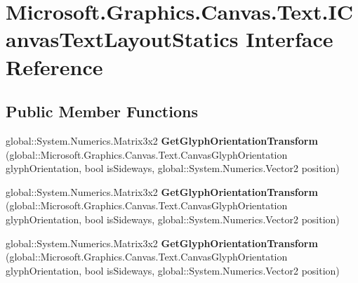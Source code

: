 \hypertarget{interface_microsoft_1_1_graphics_1_1_canvas_1_1_text_1_1_i_canvas_text_layout_statics}{}\section{Microsoft.\+Graphics.\+Canvas.\+Text.\+I\+Canvas\+Text\+Layout\+Statics Interface Reference}
\label{interface_microsoft_1_1_graphics_1_1_canvas_1_1_text_1_1_i_canvas_text_layout_statics}
\subsection*{Public Member Functions}
\begin{DoxyCompactItemize}
\item 
\mbox{\label{interface_microsoft_1_1_graphics_1_1_canvas_1_1_text_1_1_i_canvas_text_layout_statics_a4a06f4eb221890b84f41e24f6c356933}} 
global\+::\+System.\+Numerics.\+Matrix3x2 {\bfseries Get\+Glyph\+Orientation\+Transform} (global\+::\+Microsoft.\+Graphics.\+Canvas.\+Text.\+Canvas\+Glyph\+Orientation glyph\+Orientation, bool is\+Sideways, global\+::\+System.\+Numerics.\+Vector2 position)
\item 
\mbox{\label{interface_microsoft_1_1_graphics_1_1_canvas_1_1_text_1_1_i_canvas_text_layout_statics_a4a06f4eb221890b84f41e24f6c356933}} 
global\+::\+System.\+Numerics.\+Matrix3x2 {\bfseries Get\+Glyph\+Orientation\+Transform} (global\+::\+Microsoft.\+Graphics.\+Canvas.\+Text.\+Canvas\+Glyph\+Orientation glyph\+Orientation, bool is\+Sideways, global\+::\+System.\+Numerics.\+Vector2 position)
\item 
\mbox{\label{interface_microsoft_1_1_graphics_1_1_canvas_1_1_text_1_1_i_canvas_text_layout_statics_a4a06f4eb221890b84f41e24f6c356933}} 
global\+::\+System.\+Numerics.\+Matrix3x2 {\bfseries Get\+Glyph\+Orientation\+Transform} (global\+::\+Microsoft.\+Graphics.\+Canvas.\+Text.\+Canvas\+Glyph\+Orientation glyph\+Orientation, bool is\+Sideways, global\+::\+System.\+Numerics.\+Vector2 position)
\item 

\end{DoxyCompactItemize}
